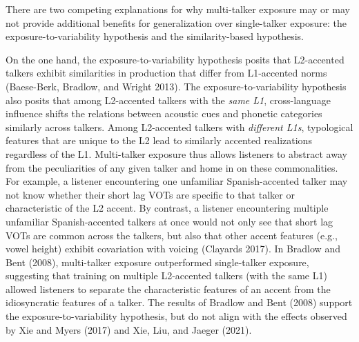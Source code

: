 \documentclass[
  preprint]{elsarticle}
\begin{document}
There are two competing explanations for why multi-talker exposure may or may not provide additional benefits for generalization over single-talker exposure: the exposure-to-variability hypothesis and the similarity-based hypothesis.

On the one hand, the exposure-to-variability hypothesis posits that L2-accented talkers exhibit similarities in production that differ from L1-accented norms (Baese-Berk, Bradlow, and Wright 2013).
The exposure-to-variability hypothesis also posits that among L2-accented talkers with the \emph{same L1}, cross-language influence shifts the relations between acoustic cues and phonetic categories similarly across talkers.
Among L2-accented talkers with \emph{different L1s}, typological features that are unique to the L2 lead to similarly accented realizations regardless of the L1.
Multi-talker exposure thus allows listeners to abstract away from the peculiarities of any given talker and home in on these commonalities.
For example, a listener encountering one unfamiliar Spanish-accented talker may not know whether their short lag VOTs are specific to that talker or characteristic of the L2 accent.
By contrast, a listener encountering multiple unfamiliar Spanish-accented talkers at once would not only see that short lag VOTs are common across the talkers, but also that other accent features (e.g., vowel height) exhibit covariation with voicing (Clayards 2017).
In Bradlow and Bent (2008), multi-talker exposure outperformed single-talker exposure, suggesting that training on multiple L2-accented talkers (with the same L1) allowed listeners to separate the characteristic features of an accent from the idiosyncratic features of a talker.
The results of Bradlow and Bent (2008) support the exposure-to-variability hypothesis, but do not align with the effects observed by Xie and Myers (2017) and Xie, Liu, and Jaeger (2021).
\end{document}
